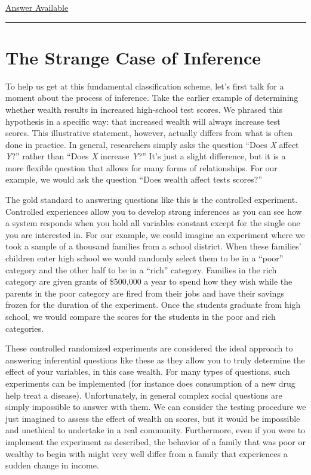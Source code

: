 \documentclass[]{memoir}
\begin{document}
\hyperref[Ans-7-5]{Answer Available}

\begin{center}\rule{3in}{0.4pt}\end{center}

\section{The Strange Case of Inference}

To help us get at this fundamental classification scheme, let's first
talk for a moment about the process of inference. Take the earlier
example of determining whether wealth results in increased high-school
test scores. We phrased this hypothesis in a specific way: that
increased wealth will always increase test scores. This illustrative
statement, however, actually differs from what is often done in
practice. In general, researchers simply asks the question ``Does
\emph{X} affect \emph{Y}?'' rather than ``Does \emph{X} increase
\emph{Y}?'' It's just a slight difference, but it is a more flexible
question that allows for many forms of relationships. For our example,
we would ask the question ``Does wealth affect tests scores?''

The gold standard to answering questions like this is the controlled
experiment. Controlled experiences allow you to develop strong
inferences as you can see how a system responds when you hold all
variables constant except for the single one you are interested in. For
our example, we could imagine an experiment where we took a sample of a
thousand families from a school district. When these families' children
enter high school we would randomly select them to be in a ``poor''
category and the other half to be in a ``rich'' category. Families in
the rich category are given grants of \$500,000 a year to spend how they
wish while the parents in the poor category are fired from their jobs
and have their savings frozen for the duration of the experiment. Once
the students graduate from high school, we would compare the scores for
the students in the poor and rich categories.

These controlled randomized experiments are considered the ideal
approach to answering inferential questions like these as they allow you
to truly determine the effect of your variables, in this case wealth.
For many types of questions, such experiments can be implemented (for
instance does consumption of a new drug help treat a disease).
Unfortunately, in general complex social questions are simply impossible
to answer with them. We can consider the testing procedure we just
imagined to assess the effect of wealth on scores, but it would be
impossible and unethical to undertake in a real community. Furthermore,
even if you were to implement the experiment as described, the behavior
of a family that was poor or wealthy to begin with might very well
differ from a family that experiences a sudden change in income.
\end{document}
